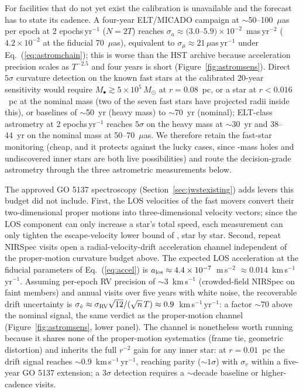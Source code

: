 \documentclass[11pt]{article}
\newcommand{\msun}{\ensuremath{M_\odot}}
\begin{document}
For facilities that do not yet exist the calibration is unavailable and the forecast has to state its cadence. A four-year ELT/MICADO campaign at $\sim$50--100~$\mu$as per epoch \citep{Davies2021} at 2 epochs\,yr$^{-1}$ ($N = 2T$) reaches $\sigma_{a}\approx(3.0$--$5.9)\times10^{-2}$~mas\,yr$^{-2}$ ($4.2\times10^{-2}$ at the fiducial 70~$\mu$as), equivalent to $\sigma_{\mu} \approx 21\,\mu$as\,yr$^{-1}$ under Eq.~(\ref{eq:astromchain}); this is worse than the HST archive because acceleration precision scales as $T^{-2.5}$ and four years is short (Figure~\ref{fig:astromsens}). Direct $5\sigma$ curvature detection on the known fast stars at the calibrated 20-year sensitivity would require $M_{\bullet}\gtrsim 5\times10^{5}\,\msun$ at $r = 0.08$~pc, or a star at $r < 0.016$~pc at the nominal mass (two of the seven fast stars have projected radii inside this), or baselines of $\sim$50~yr (heavy mass) to $\sim$70~yr (nominal); ELT-class astrometry at 2 epochs\,yr$^{-1}$ reaches $5\sigma$ on the heavy mass at $\sim$30~yr and 38--44~yr on the nominal mass at 50--70~$\mu$as. We therefore retain the fast-star monitoring (cheap, and it protects against the lucky cases, since \citealt{GonzalezPrieto2025}-mass holes and undiscovered inner stars are both live possibilities) and route the decision-grade astrometry through the three astrometric measurements below.

The approved GO 5137 spectroscopy (Section~\ref{sec:jwstexisting}) adds levers this budget did not include. First, the LOS velocities of the fast movers convert their two-dimensional proper motions into three-dimensional velocity vectors; since the LOS component can only increase a star's total speed, each measurement can only tighten the escape-velocity lower bound of \citet{Haberle2024Nature}, star by star. Second, repeat NIRSpec visits open a radial-velocity-drift acceleration channel independent of the proper-motion curvature budget above. The expected LOS acceleration at the fiducial parameters of Eq.~(\ref{eq:accel}) is $a_{\rm los} \approx 4.4\times10^{-7}$~m\,s$^{-2}$ $\approx 0.014$~km\,s$^{-1}$\,yr$^{-1}$. Assuming per-epoch RV precision of $\sim$3~km\,s$^{-1}$ (crowded-field NIRSpec on faint members) and annual visits over five years with white noise, the recoverable drift uncertainty is $\sigma_{\dot v} \approx \sigma_{\rm RV}\sqrt{12}/(\sqrt{n}\,T) \approx 0.9$~km\,s$^{-1}$\,yr$^{-1}$: a factor $\sim$70 above the nominal signal, the same verdict as the proper-motion channel (Figure~\ref{fig:astromsens}, lower panel). The channel is nonetheless worth running because it shares none of the proper-motion systematics (frame tie, geometric distortion) and inherits the full $r^{-2}$ gain for any inner star: at $r = 0.01$~pc the drift signal reaches $\sim$0.9~km\,s$^{-1}$\,yr$^{-1}$, reaching parity ($\sim1\sigma$) with $\sigma_{\dot v}$ within a five-year GO 5137 extension; a $3\sigma$ detection requires a $\sim$decade baseline or higher-cadence visits.
\end{document}
